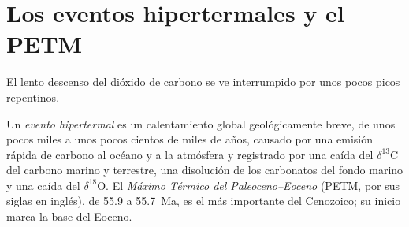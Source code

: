 \section{Los eventos hipertermales y el PETM}\label{sec:b2:deep-time-climate:petm}

El lento descenso del dióxido de carbono se ve interrumpido por unos pocos picos repentinos.

\begin{definition}\label{def:b2:deep-time-climate:petm}
Un \emph{evento hipertermal} es un calentamiento global geológicamente breve, de unos pocos
miles a unos pocos cientos de miles de años, causado por una emisión rápida de carbono al océano y a la
atmósfera y registrado por una caída del $\delta^{13}$C del carbono marino y terrestre, una
disolución de los carbonatos del fondo marino y una caída del $\delta^{18}$O. El \emph{Máximo Térmico del Paleoceno--Eoceno}
(PETM, por sus siglas en inglés), de 55.9 a \qty{55.7}{Ma}, es el
más importante del Cenozoico; su inicio marca la base del Eoceno.
\end{definition}

